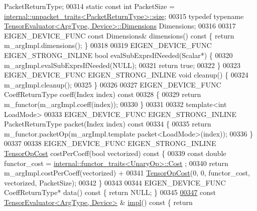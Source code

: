 \begin{DoxyCode}
      PacketReturnType;
00314   \textcolor{keyword}{static} \textcolor{keyword}{const} \textcolor{keywordtype}{int} PacketSize = 
      \hyperlink{struct_eigen_1_1internal_1_1unpacket__traits}{internal::unpacket\_traits<PacketReturnType>::size};
00315   \textcolor{keyword}{typedef} \textcolor{keyword}{typename} \hyperlink{struct_eigen_1_1_tensor_evaluator}{TensorEvaluator<ArgType, Device>::Dimensions}
       Dimensions;
00316 
00317   EIGEN\_DEVICE\_FUNC \textcolor{keyword}{const} Dimensions& dimensions()\textcolor{keyword}{ const }\{ \textcolor{keywordflow}{return} m\_argImpl.dimensions(); \}
00318 
00319   EIGEN\_DEVICE\_FUNC EIGEN\_STRONG\_INLINE \textcolor{keywordtype}{bool} evalSubExprsIfNeeded(Scalar*) \{
00320     m\_argImpl.evalSubExprsIfNeeded(NULL);
00321     \textcolor{keywordflow}{return} \textcolor{keyword}{true};
00322   \}
00323   EIGEN\_DEVICE\_FUNC EIGEN\_STRONG\_INLINE \textcolor{keywordtype}{void} cleanup() \{
00324     m\_argImpl.cleanup();
00325   \}
00326 
00327   EIGEN\_DEVICE\_FUNC CoeffReturnType coeff(Index index)\textcolor{keyword}{ const}
00328 \textcolor{keyword}{  }\{
00329     \textcolor{keywordflow}{return} m\_functor(m\_argImpl.coeff(index));
00330   \}
00331 
00332   \textcolor{keyword}{template}<\textcolor{keywordtype}{int} LoadMode>
00333   EIGEN\_DEVICE\_FUNC EIGEN\_STRONG\_INLINE PacketReturnType packet(Index index)\textcolor{keyword}{ const}
00334 \textcolor{keyword}{  }\{
00335     \textcolor{keywordflow}{return} m\_functor.packetOp(m\_argImpl.template packet<LoadMode>(index));
00336   \}
00337 
00338   EIGEN\_DEVICE\_FUNC EIGEN\_STRONG\_INLINE \hyperlink{class_eigen_1_1_tensor_op_cost}{TensorOpCost} costPerCoeff(\textcolor{keywordtype}{bool} vectorized)\textcolor{keyword}{ const }\{
00339     \textcolor{keyword}{const} \textcolor{keywordtype}{double} functor\_cost = \hyperlink{struct_eigen_1_1internal_1_1functor__traits}{internal::functor\_traits<UnaryOp>::Cost}
      ;
00340     \textcolor{keywordflow}{return} m\_argImpl.costPerCoeff(vectorized) +
00341         \hyperlink{class_eigen_1_1_tensor_op_cost}{TensorOpCost}(0, 0, functor\_cost, vectorized, PacketSize);
00342   \}
00343 
00344   EIGEN\_DEVICE\_FUNC CoeffReturnType* data()\textcolor{keyword}{ const }\{ \textcolor{keywordflow}{return} NULL; \}
00345 
\hyperlink{struct_eigen_1_1_tensor_evaluator_3_01const_01_tensor_cwise_unary_op_3_01_unary_op_00_01_arg_type_01_4_00_01_device_01_4_a80a58a89394506341c8f5f10d13c03e7}{00347}   \textcolor{keyword}{const} \hyperlink{struct_eigen_1_1_tensor_evaluator}{TensorEvaluator<ArgType, Device>} & \hyperlink{struct_eigen_1_1_tensor_evaluator_3_01const_01_tensor_cwise_unary_op_3_01_unary_op_00_01_arg_type_01_4_00_01_device_01_4_a80a58a89394506341c8f5f10d13c03e7}{impl}()\textcolor{keyword}{ const }\{ \textcolor{keywordflow}{return} 

\end{DoxyCode}
